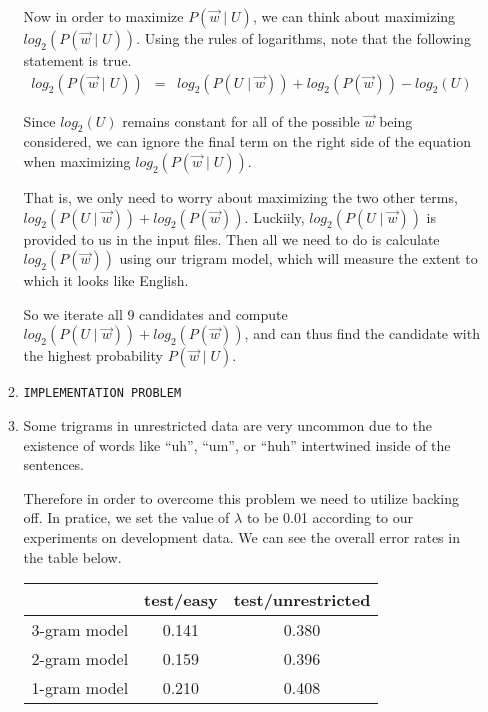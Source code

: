 \documentclass[11pt]{article}
\begin{document}
\begin{enumerate}
\begin{enumerate}[label=(\alph*)]
		Now in order to maximize $P(\vec{w} \mid U)$, we can think about maximizing $log_2(P(\vec{w} \mid U))$. Using the rules of logarithms, note that the following statement is true.
		\begin{eqnarray*}
			log_2(P(\vec{w} \mid U)) &=& log_2(P(U \mid \vec{w})) + log_2(P(\vec{w})) - log_2(U)
		\end{eqnarray*}

		Since $log_2(U)$ remains constant for all of the possible $\vec{w}$ being considered, we can ignore the final term on the right side of the equation when maximizing $log_2(P(\vec{w} \mid U))$. \vspace{4pt}

		That is, we only need to worry about maximizing the two other terms, $log_2(P(U \mid \vec{w})) + log_2(P(\vec{w}))$. Luckiily, $log_2(P(U \mid \vec{w}))$ is provided to us in the input files. Then all we need to do is calculate $log_2(P(\vec{w}))$ using our trigram model, which will measure the extent to which it looks like English. \vspace{4pt}

		So we iterate all 9 candidates and compute $log_2(P(U \mid \vec{w})) + log_2(P(\vec{w}))$, and can thus find the candidate with the highest probability $P(\vec{w} \mid U)$.
	\item
		\texttt{IMPLEMENTATION PROBLEM}
	\item
		Some trigrams in unrestricted data are very uncommon due to the existence of words like ``uh'', ``um'', or ``huh'' intertwined inside of the sentences. \vspace{4pt}

		Therefore in order to overcome this problem we need to utilize backing off. In pratice, we set the value of $\lambda$ to be 0.01 according to our experiments on development data. We can see the overall error rates in the table below. \\

		\begin{center}\begin{tabular}{| r || c | c |}
			\hline
			\ 				&	test/easy	&	test/unrestricted 	\\
			\hline \hline
			3-gram model 	&	0.141		&	0.380				\\
			2-gram model 	&	0.159		&	0.396				\\
			1-gram model 	&	0.210		&	0.408				\\
			\hline	
		\end{tabular}\end{center}


\end{enumerate}
\end{enumerate}
\end{document}
